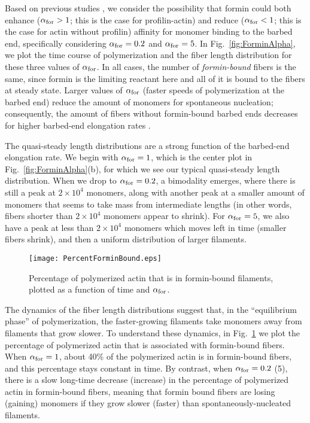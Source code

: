 \documentclass[11pt]{article}
\begin{document}
Based on previous studies \cite{zweifel2021nucleation, funk2019profilin}, we consider the possibility that formin could both enhance ($\alpha_\text{for} > 1$; this is the case for profilin-actin) and reduce ($\alpha_\text{for} < 1$; this is the case for actin without profilin) affinity for monomer binding to the barbed end, specifically considering $\alpha_\text{for}=0.2$ and $\alpha_\text{for}=5$. In Fig.\ \ref{fig:ForminAlpha}, we plot the time course of polymerization and the fiber length distribution for these three values of $\alpha_\text{for}$. In all cases, the number of \emph{formin-bound} fibers is the same, since formin is the limiting reactant here and all of it is bound to the fibers at steady state. Larger values of $\alpha_\text{for}$ (faster speeds of polymerization at the barbed end) reduce the amount of monomers for spontaneous nucleation; consequently, the amount of fibers without formin-bound barbed ends decreases for higher barbed-end elongation rates \cite{banerjee2022emergence}.

The quasi-steady length distributions are a strong function of the barbed-end elongation rate. We begin with $\alpha_\text{for}=1$, which is the center plot in Fig.\ \ref{fig:ForminAlpha}(b), for which we see our typical quasi-steady length distribution. When we drop to $\alpha_\text{for}=0.2$, a bimodality emerges, where there is still a peak at $2 \times 10^4$ monomers, along with another peak at a smaller amount of monomers that seems to take mass from intermediate lengths (in other words, fibers shorter than $2 \times 10^4$ monomers appear to shrink). For $\alpha_\text{for}=5$, we also have a peak at less than $2 \times 10^4$ monomers which moves left in time (smaller fibers shrink), and then a uniform distribution of larger filaments. 

\begin{figure}
\centering
\texttt{[image: PercentForminBound.eps]}
\caption{\label{fig:PercForminBd}Percentage of polymerized actin that is in formin-bound filaments, plotted as a function of time and $\alpha_\text{for}$.}
\end{figure}

The dynamics of the fiber length distributions suggest that, in the ``equilibrium phase'' of polymerization, the faster-growing filaments take monomers away from filaments that grow slower. To understand these dynamics, in Fig.\ \ref{fig:PercForminBd} we plot the percentage of polymerized actin that is associated with formin-bound fibers. When $\alpha_\text{for}=1$, about 40\% of the polymerized actin is in formin-bound fibers, and this percentage stays constant in time. By contrast, when $\alpha_\text{for}=0.2$ (5), there is a slow long-time decrease (increase) in the percentage of polymerized actin in formin-bound fibers, meaning that formin bound fibers are losing (gaining) monomers if they grow slower (faster) than spontaneously-nucleated filaments. 
\end{document}
